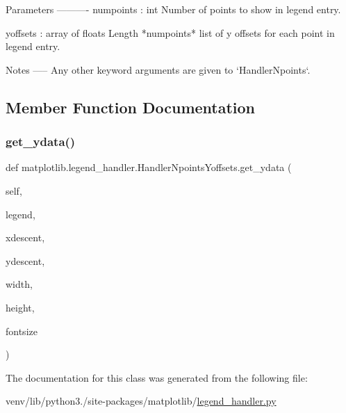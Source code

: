 \begin{DoxyVerb}Parameters
----------
numpoints : int
    Number of points to show in legend entry.

yoffsets : array of floats
    Length *numpoints* list of y offsets for each point in
    legend entry.

Notes
-----
Any other keyword arguments are given to `HandlerNpoints`.
\end{DoxyVerb}
 

\subsection{Member Function Documentation}
\mbox{\label{classmatplotlib_1_1legend__handler_1_1HandlerNpointsYoffsets_a4ec3e1afd63ed47a405ec36dc1205deb}} 
\subsubsection{\texorpdfstring{get\+\_\+ydata()}{get\_ydata()}}
{\footnotesize\ttfamily def matplotlib.\+legend\+\_\+handler.\+Handler\+Npoints\+Yoffsets.\+get\+\_\+ydata (\begin{DoxyParamCaption}\item[{}]{self,  }\item[{}]{legend,  }\item[{}]{xdescent,  }\item[{}]{ydescent,  }\item[{}]{width,  }\item[{}]{height,  }\item[{}]{fontsize }\end{DoxyParamCaption})}



The documentation for this class was generated from the following file\+:\begin{DoxyCompactItemize}
\item 
venv/lib/python3./site-\/packages/matplotlib/\hyperlink{legend__handler_8py}{legend\+\_\+handler.\+py}\end{DoxyCompactItemize}
